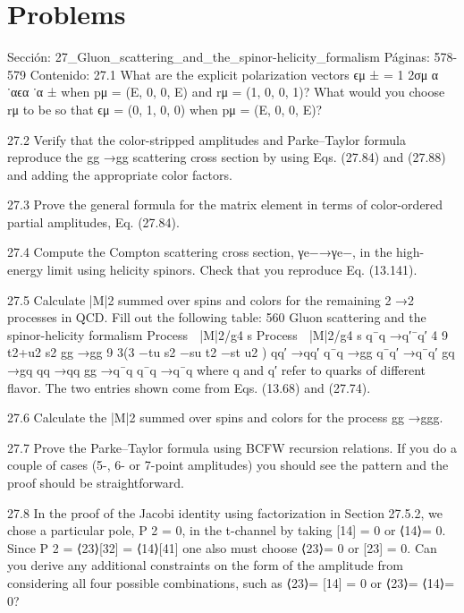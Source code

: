 \section*{Problems}
Sección: 27_Gluon_scattering_and_the_spinor-helicity_formalism
Páginas: 578-579
Contenido:
27.1 What are the explicit polarization vectors ϵμ
± = 1
2σμ
α ˙αϵα ˙α
± when pμ = (E, 0, 0, E)
and rμ = (1, 0, 0, 1)? What would you choose rμ to be so that ϵμ = (0, 1, 0, 0) when
pμ = (E, 0, 0, E)?

27.2 Verify that the color-stripped amplitudes and Parke–Taylor formula reproduce the
gg →gg scattering cross section by using Eqs. (27.84) and (27.88) and adding the
appropriate color factors.

27.3 Prove the general formula for the matrix element in terms of color-ordered partial
amplitudes, Eq. (27.84).

27.4 Compute the Compton scattering cross section, γe−→γe−, in the high-energy
limit using helicity spinors. Check that you reproduce Eq. (13.141).

27.5 Calculate |M|2 summed over spins and colors for the remaining 2 →2 processes in
QCD. Fill out the following table:
560
Gluon scattering and the spinor-helicity formalism
Process
 |M|2/g4
s
Process
 |M|2/g4
s
q¯q →q′¯q′
4
9
t2+u2
s2
gg →gg
9
3(3 −tu
s2 −su
t2 −st
u2 )
qq′ →qq′
q¯q →gg
q¯q′ →q¯q′
gq →gq
qq →qq
gg →q¯q
q¯q →q¯q
where q and q′ refer to quarks of different ﬂavor. The two entries shown come from
Eqs. (13.68) and (27.74).

27.6 Calculate the |M|2 summed over spins and colors for the process gg →ggg.

27.7 Prove the Parke–Taylor formula using BCFW recursion relations. If you do a couple
of cases (5-, 6- or 7-point amplitudes) you should see the pattern and the proof should
be straightforward.

27.8 In the proof of the Jacobi identity using factorization in Section 27.5.2, we chose a
particular pole, P 2 = 0, in the t-channel by taking [14] = 0 or ⟨14⟩= 0. Since
P 2 = ⟨23⟩[32] = ⟨14⟩[41] one also must choose ⟨23⟩= 0 or [23] = 0. Can you
derive any additional constraints on the form of the amplitude from considering all
four possible combinations, such as ⟨23⟩= [14] = 0 or ⟨23⟩= ⟨14⟩= 0?

